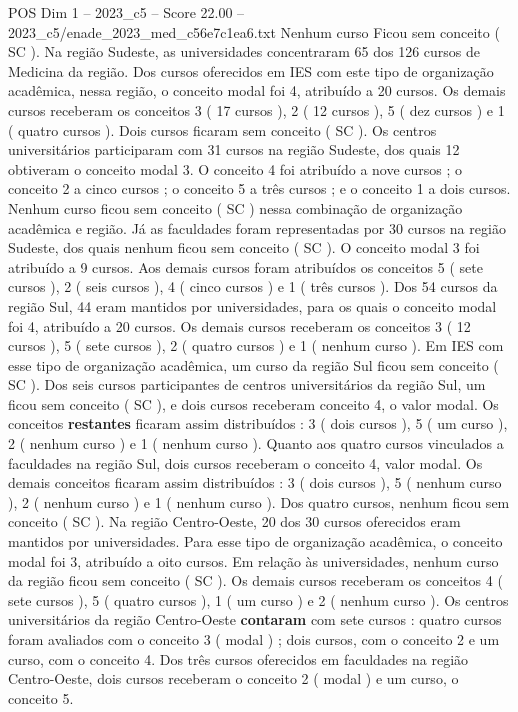 \begin{textsample}{POS Dim 1 – 2023\_c5 – Score 22.00 – 2023\_c5/enade\_2023\_med\_c56e7c1ea6.txt}
Nenhum curso Ficou sem conceito ( SC ).
Na região Sudeste, as universidades concentraram 65 dos 126 cursos de Medicina da região.
Dos cursos oferecidos em IES com este tipo de organização acadêmica, nessa região, o conceito modal foi 4, atribuído a 20 cursos.
Os demais cursos receberam os conceitos 3 ( 17 cursos ), 2 ( 12 cursos ), 5 ( dez cursos ) e 1 ( quatro cursos ).
Dois cursos ficaram sem conceito ( SC ).
Os centros universitários participaram com 31 cursos na região Sudeste, dos quais 12 obtiveram o conceito modal 3.
O conceito 4 foi atribuído a nove cursos ; o conceito 2 a cinco cursos ; o conceito 5 a três cursos ; e o conceito 1 a dois cursos.
Nenhum curso ficou sem conceito ( SC ) nessa combinação de organização acadêmica e região.
Já as faculdades foram representadas por 30 cursos na região Sudeste, dos quais nenhum ficou sem conceito ( SC ).
O conceito modal 3 foi atribuído a 9 cursos.
Aos demais cursos foram atribuídos os conceitos 5 ( sete cursos ), 2 ( seis cursos ), 4 ( cinco cursos ) e 1 ( três cursos ).
Dos 54 cursos da região Sul, 44 eram mantidos por universidades, para os quais o conceito modal foi 4, atribuído a 20 cursos.
Os demais cursos receberam os conceitos 3 ( 12 cursos ), 5 ( sete cursos ), 2 ( quatro cursos ) e 1 ( nenhum curso ).
Em IES com esse tipo de organização acadêmica, um curso da região Sul ficou sem conceito ( SC ).
Dos seis cursos participantes de centros universitários da região Sul, um ficou sem conceito ( SC ), e dois cursos receberam conceito 4, o valor modal.
Os conceitos \textbf{restantes} ficaram assim distribuídos : 3 ( dois cursos ), 5 ( um curso ), 2 ( nenhum curso ) e 1 ( nenhum curso ).
Quanto aos quatro cursos vinculados a faculdades na região Sul, dois cursos receberam o conceito 4, valor modal.
Os demais conceitos ficaram assim distribuídos : 3 ( dois cursos ), 5 ( nenhum curso ), 2 ( nenhum curso ) e 1 ( nenhum curso ).
Dos quatro cursos, nenhum ficou sem conceito ( SC ).
Na região Centro-Oeste, 20 dos 30 cursos oferecidos eram mantidos por universidades.
Para esse tipo de organização acadêmica, o conceito modal foi 3, atribuído a oito cursos.
Em relação às universidades, nenhum curso da região ficou sem conceito ( SC ).
Os demais cursos receberam os conceitos 4 ( sete cursos ), 5 ( quatro cursos ), 1 ( um curso ) e 2 ( nenhum curso ).
Os centros universitários da região Centro-Oeste \textbf{contaram} com sete cursos : quatro cursos foram avaliados com o conceito 3 ( modal ) ; dois cursos, com o conceito 2 e um curso, com o conceito 4.
Dos três cursos oferecidos em faculdades na região Centro-Oeste, dois cursos receberam o conceito 2 ( modal ) e um curso, o conceito 5.

\end{textsample}
